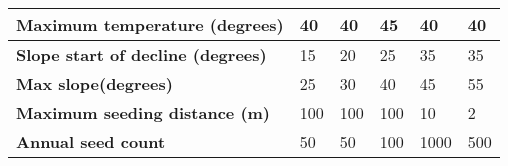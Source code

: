 \begin{longtable}{|p{4cm}|p{2cm}|p{2cm}|p{2cm}|p{2cm}|p{2cm}|}
		\hline
		\textbf{Maximum temperature (degrees)} & 
		40 & 
		40 & 
		45 & 
		40 & 
		40 \\
		\hline
		\textbf{Slope start of decline (degrees)} & 
		15 & 
		20 & 
		25 & 
		35 & 
		35 \\
		\hline
		\textbf{Max slope(degrees)} & 
		25 & 
		30 & 
		40 & 
		45 & 
		55 \\
		\hline
		\textbf{Maximum seeding distance (m)} & 
		100 & 
		100 & 
		100 & 
		10 & 
		2 \\
		\hline
		\textbf{Annual seed count} & 
		50 & 
		50 & 
		100 & 
		1000 & 
		500 \\
		\hline                                                                           
\end{longtable}